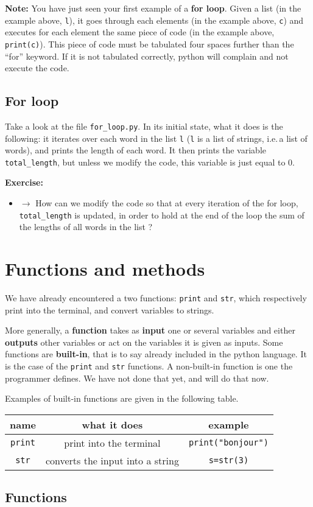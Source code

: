 \documentclass{article}
\newcommand{\note}[1]{
\begin{mdframed}[backgroundcolor=green!30!white]
\textbf{Note:} #1
\end{mdframed}
}
\newcommand{\exercise}[1]{
\begin{mdframed}[backgroundcolor=black!20!white]
\textbf{Exercise:} #1
\end{mdframed}
}
\begin{document}
\note{You have just seen your first example of a \textbf{for loop}.
Given a list (in the example above, {\tt l}), it goes through each elements
(in the example above, {\tt c}) and executes for each element the
same piece of code (in the example above, {\tt print(c)}). 
This piece of code must be tabulated four spaces further than the ``for'' keyword.
If it is not tabulated correctly, python will complain and not
execute the code.
}

\subsection{For loop}

Take a look at the file {\tt for\_loop.py}.
In its initial state, what it does is the following:
it iterates over each word in the list {\tt l} ({\tt l} is 
a list of strings, i.e.\,a list of words), and
prints the length of each word.
It then prints the variable {\tt total\_length}, but unless we modify
the code, this variable is just equal to 0.

\exercise{
\begin{itemize}
    \item $\rightarrow$ How can we modify the code so that
        at every iteration of the for loop, {\tt total\_length}
        is updated, in order to hold at the end of the loop the sum
        of the lengths of all words in the list ?
\end{itemize}
}


\section{Functions and methods}
\label{functions}

We have already encountered a two functions: {\tt print} and {\tt str},
which respectively print into the terminal, and convert variables to strings.

More generally, a \textbf{function} takes as \textbf{input} one or
several variables and either \textbf{outputs} other variables or
act on the variables it is given as inputs. Some functions are
\textbf{built-in}, that is to say already included in the python language.
It is the case of the {\tt print} and {\tt str} functions. A non-built-in
function is one the programmer defines. We have not done that yet,
and will do that now.


Examples of built-in functions are given in the following table.
\begin{center}
    \begin{tabular}{|c|c|c|}
    \hline
    name & what it does & example \\
    \hline
        {\tt print} & print into the terminal & {\tt print("bonjour")}\\
    \hline
        {\tt str} & converts the input into a string & {\tt s=str(3)}\\
    \hline
    \end{tabular}
\end{center}

\subsection{Functions}
\end{document}
